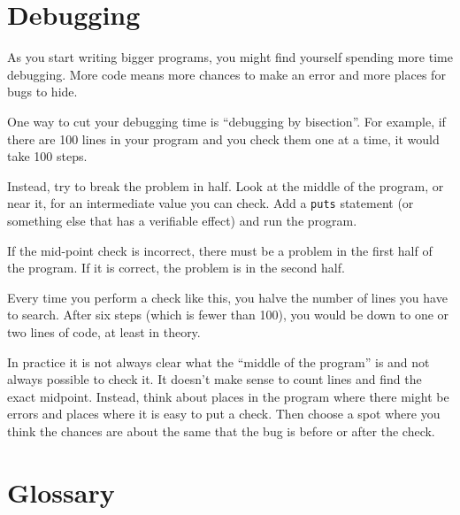 \documentclass[10pt]{book}
\begin{document}
\section{Debugging}
\label{bisectbug}

As you start writing bigger programs, you might find yourself
spending more time debugging.  More code means more chances to
make an error and more places for bugs to hide.

One way to cut your debugging time is ``debugging by bisection''.
For example, if there are 100 lines in your program and you
check them one at a time, it would take 100 steps.

Instead, try to break the problem in half.  Look at the middle
of the program, or near it, for an intermediate value you
can check.  Add a {\tt puts} statement (or something else
that has a verifiable effect) and run the program.

If the mid-point check is incorrect, there must be a problem in the
first half of the program.  If it is correct, the problem is
in the second half.

Every time you perform a check like this, you halve the number of
lines you have to search.  After six steps (which is fewer than 100),
you would be down to one or two lines of code, at least in theory.

In practice it is not always clear what
the ``middle of the program'' is and not always possible to
check it.  It doesn't make sense to count lines and find the
exact midpoint.  Instead, think about places
in the program where there might be errors and places where it
is easy to put a check.  Then choose a spot where you
think the chances are about the same that the bug is before
or after the check.




\section{Glossary}
\end{document}
